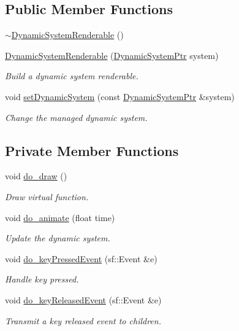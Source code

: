 \subsection*{Public Member Functions}
\begin{DoxyCompactItemize}
\item 
\hyperlink{classDynamicSystemRenderable_a9d6411c143db28c2d623928ac98f6aec}{$\sim$\+Dynamic\+System\+Renderable} ()
\item 
\hyperlink{classDynamicSystemRenderable_ab29cba8d5166e9cd636481e0bf284302}{Dynamic\+System\+Renderable} (\hyperlink{DynamicSystem_8hpp_a682a5f32e97dba69e8a4e542ed98b419}{Dynamic\+System\+Ptr} system)
\begin{DoxyCompactList}\small\item\em Build a dynamic system renderable. \end{DoxyCompactList}\item 
void \hyperlink{classDynamicSystemRenderable_a700986b9410c1d4a0a6ece669967b7c0}{set\+Dynamic\+System} (const \hyperlink{DynamicSystem_8hpp_a682a5f32e97dba69e8a4e542ed98b419}{Dynamic\+System\+Ptr} \&system)
\begin{DoxyCompactList}\small\item\em Change the managed dynamic system. \end{DoxyCompactList}\end{DoxyCompactItemize}
\subsection*{Private Member Functions}
\begin{DoxyCompactItemize}
\item 
void \hyperlink{classDynamicSystemRenderable_a8064176726a5d4b857a5e6a0fc73ff29}{do\+\_\+draw} ()
\begin{DoxyCompactList}\small\item\em Draw virtual function. \end{DoxyCompactList}\item 
void \hyperlink{classDynamicSystemRenderable_acd30af04cdca7cdc68ae2d49c179d2dc}{do\+\_\+animate} (float time)
\begin{DoxyCompactList}\small\item\em Update the dynamic system. \end{DoxyCompactList}\item 
void \hyperlink{classDynamicSystemRenderable_ac179f3ba1cc294589327e7cb569c50da}{do\+\_\+key\+Pressed\+Event} (sf\+::\+Event \&e)
\begin{DoxyCompactList}\small\item\em Handle key pressed. \end{DoxyCompactList}\item 
void \hyperlink{classDynamicSystemRenderable_ac074ccfc934f15607b4db103c2281a64}{do\+\_\+key\+Released\+Event} (sf\+::\+Event \&e)
\begin{DoxyCompactList}\small\item\em Transmit a key released event to children. \end{DoxyCompactList}\end{DoxyCompactItemize}
